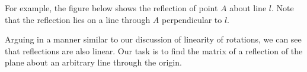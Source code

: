 \documentclass{ximera}
\begin{document}
For example, the figure below shows the reflection of point $A$ about line $l$.  Note that the reflection lies on a line through $A$ perpendicular to $l$.

\begin{image}[2in]  
    \end{image}
    
    Arguing in a manner similar to our discussion of linearity of rotations, we can see that reflections are also linear.  Our task is to find the matrix of a reflection of the plane about an arbitrary line through the origin.
  
\end{document}

